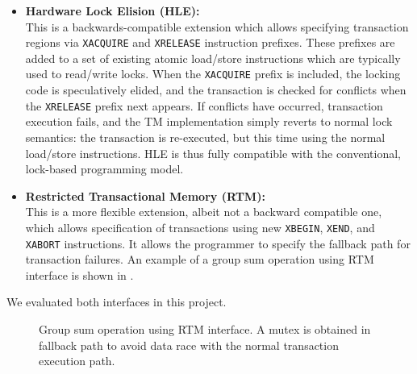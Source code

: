 \begin{itemize} 
\item \textbf{Hardware Lock Elision (HLE):} \\ This is a backwards-compatible
  extension which allows specifying transaction regions via \texttt{XACQUIRE}
  and \texttt{XRELEASE} instruction prefixes. These prefixes are added to a set
  of existing atomic load/store instructions which are typically used to
  read/write locks. When the \texttt{XACQUIRE} prefix is included, the locking
  code is speculatively elided, and the transaction is checked for conflicts
  when the \texttt{XRELEASE} prefix next appears. If conflicts have occurred,
  transaction execution fails, and the TM implementation simply reverts to
  normal lock semantics: the transaction is re-executed, but this time using the
  normal load/store instructions. HLE is thus fully compatible with the
  conventional, lock-based programming model. \\
\item \textbf{Restricted Transactional Memory (RTM):} \\ This is a more flexible
  extension, albeit not a backward compatible one, which allows specification of
  transactions using new \texttt{XBEGIN}, \texttt{XEND}, and \texttt{XABORT}
  instructions. It allows the programmer to specify the fallback path for
  transaction failures. An example of a group sum operation using RTM interface
  is shown in .\\
\end{itemize}

We evaluated both interfaces in this project.

 \begin{figure}
    \parbox[t]{0.45\textwidth}{} \caption{Group
        sum operation using RTM interface. A mutex is obtained in fallback path
to avoid data race with the normal transaction execution path.} \label{fig:rtm}
\end{figure}
